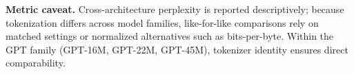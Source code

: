 \documentclass[11pt]{article}
\begin{document}
\textbf{Metric caveat.} Cross-architecture perplexity is reported descriptively; because tokenization differs across model families, like-for-like comparisons rely on matched settings or normalized alternatives such as bits-per-byte.
Within the GPT family (GPT-16M, GPT-22M, GPT-45M), tokenizer identity ensures direct comparability.
\end{document}
